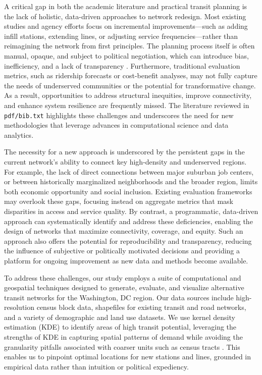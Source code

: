 \documentclass[manuscript,screen,review]{acmart}
\begin{document}
A critical gap in both the academic literature and practical transit planning is the lack of holistic, data-driven approaches to network redesign. Most existing studies and agency efforts focus on incremental improvements—such as adding infill stations, extending lines, or adjusting service frequencies—rather than reimagining the network from first principles. The planning process itself is often manual, opaque, and subject to political negotiation, which can introduce bias, inefficiency, and a lack of transparency \cite{bib:camporeale2016equity}. Furthermore, traditional evaluation metrics, such as ridership forecasts or cost-benefit analyses, may not fully capture the needs of underserved communities or the potential for transformative change. As a result, opportunities to address structural inequities, improve connectivity, and enhance system resilience are frequently missed. The literature reviewed in \texttt{pdf/bib.txt} highlights these challenges and underscores the need for new methodologies that leverage advances in computational science and data analytics.

The necessity for a new approach is underscored by the persistent gaps in the current network's ability to connect key high-density and underserved regions. For example, the lack of direct connections between major suburban job centers, or between historically marginalized neighborhoods and the broader region, limits both economic opportunity and social inclusion. Existing evaluation frameworks may overlook these gaps, focusing instead on aggregate metrics that mask disparities in access and service quality. By contrast, a programmatic, data-driven approach can systematically identify and address these deficiencies, enabling the design of networks that maximize connectivity, coverage, and equity. Such an approach also offers the potential for reproducibility and transparency, reducing the influence of subjective or politically motivated decisions and providing a platform for ongoing improvement as new data and methods become available.

To address these challenges, our study employs a suite of computational and geospatial techniques designed to generate, evaluate, and visualize alternative transit networks for the Washington, DC region. Our data sources include high-resolution census block data, shapefiles for existing transit and road networks, and a variety of demographic and land use datasets. We use kernel density estimation (KDE) to identify areas of high transit potential, leveraging the strengths of KDE in capturing spatial patterns of demand while avoiding the granularity pitfalls associated with coarser units such as census tracts \cite{bib:silverman1986density}. This enables us to pinpoint optimal locations for new stations and lines, grounded in empirical data rather than intuition or political expediency.
\end{document}

